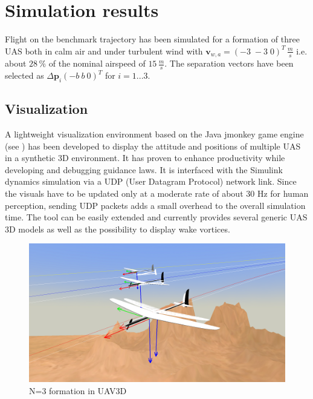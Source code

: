 \documentclass{ifacconf}
\newcommand{\mbf}[1]{\mathbf{#1}}
\providecommand{\mbf}[1]{\mathbf{#1}}
\begin{document}
\section{Simulation results}
\label{sec:simresults}
Flight on the benchmark trajectory has been simulated for a formation of three UAS both in calm air and under turbulent wind with $\mbf{v}_{w,a} = (-3 \; -3 \; 0)^T \, \frac{m}{s}$ i.e. about $28 \, \%$ of the nominal airspeed of $15 \, \frac{m}{s}$. The separation vectors have been selected as $\Delta \mbf{p}_i (-b \: b \: 0)^T$ for $i=1...3$.

\subsection{Visualization}
A lightweight visualization environment based on the Java jmonkey game engine (see \cite{jmonkeyengine}) has been developed to display the attitude and positions of multiple UAS in a synthetic 3D environment. 
It has proven to enhance productivity while developing and debugging guidance laws. 
It is interfaced with the Simulink dynamics simulation via a UDP (User Datagram Protocol) network link. Since the visuals have to be updated only at a moderate rate of about 30 Hz for human perception, sending UDP packets adds a small overhead to the overall simulation time. The tool can be easily extended and currently provides several generic UAS 3D models as well as the possibility to display wake vortices.
\begin{figure}
\centering
\includegraphics[width=\columnwidth]{UAV3D_N=3-lowres}
\caption{N=3 formation in UAV3D}
\end{figure}
\end{document}
